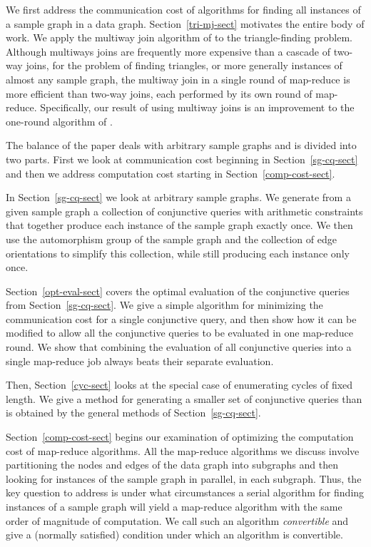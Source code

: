 We first address the communication cost of algorithms for finding all instances of a sample graph in a data graph.  Section~\ref{tri-mj-sect} motivates the entire body of work.  We apply the multiway join algorithm of \cite{AU10} to the triangle-finding problem.  Although multiways joins are frequently more expensive than a cascade of two-way joins, for the problem of finding triangles, or more generally instances of almost any sample graph, the multiway join in a single round of map-reduce is more efficient than two-way joins, each performed by its own round of map-reduce.
Specifically, our result of using multiway joins is an improvement to the one-round algorithm of \cite{SV11}.

The balance of the paper deals with arbitrary sample graphs and is divided into two parts. First we look at communication cost beginning in Section~\ref{sg-cq-sect} and then we address computation cost starting in Section~\ref{comp-cost-sect}.

In Section~\ref{sg-cq-sect} we look at arbitrary sample graphs.  We generate from a given sample graph a collection of conjunctive queries with arithmetic constraints that together produce each instance of the sample graph exactly once.  We then use the automorphism group of the sample graph and the collection of edge orientations to simplify this collection, while still producing each instance only once.

Section~\ref{opt-eval-sect} covers the optimal evaluation of the conjunctive queries from Section~\ref{sg-cq-sect}.  We give a simple algorithm for minimizing the communication cost for a single conjunctive query, and then show how it can be modified to allow all the conjunctive queries to be evaluated in one map-reduce round.
We show that combining the evaluation of all conjunctive queries into a single map-reduce job always beats their separate evaluation.

Then, Section~\ref{cyc-sect} looks at the special case of enumerating cycles of fixed length.  We give a method for generating a smaller set of conjunctive queries than is obtained by the general methods of Section~\ref{sg-cq-sect}.

Section~\ref{comp-cost-sect} begins our examination of optimizing the computation cost of map-reduce algorithms.  All the map-reduce algorithms we discuss involve partitioning the nodes and edges of the data graph into subgraphs and then looking for instances of the sample graph in parallel, in each subgraph.  Thus, the key question to address is under what circumstances a serial algorithm for finding instances of a sample graph  will yield a map-reduce algorithm with the same order of magnitude of computation.  We call such an algorithm {\em convertible}  and give a (normally satisfied) condition under which an algorithm is convertible.

